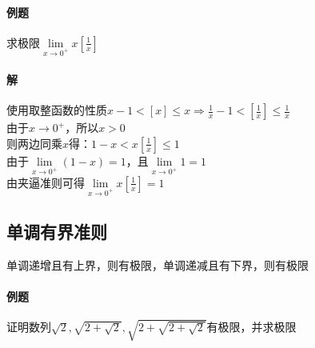 \documentclass{article}
\begin{document}
\begin{flushleft}
	\paragraph{例题}
	求极限$\lim\limits_{x\to 0^+}x[\frac{1}{x}]$
	\paragraph{解}
	使用取整函数的性质$x-1<[x]\le x\Rightarrow \frac{1}{x}-1<[\frac{1}{x}]\le \frac{1}{x}$\\
	由于$x\to 0^+$，所以$x>0$\\
	则两边同乘$x$得：$1-x<x[\frac{1}{x}]\le 1$\\
	由于$\lim\limits_{x\to 0^+}(1-x)=1$，且$\lim\limits_{x\to 0^+}1=1$\\
	由夹逼准则可得$\lim\limits_{x\to 0^+}x[\frac{1}{x}]=1$\\
	
	\subsection{单调有界准则}
	单调递增且有上界，则有极限，单调递减且有下界，则有极限\\
	
	\paragraph{例题}
	证明数列$\sqrt{2}, \sqrt{2+\sqrt{2}}, \sqrt{2+\sqrt{2+\sqrt{2}}}$有极限，并求极限

\end{flushleft}
\end{document}
